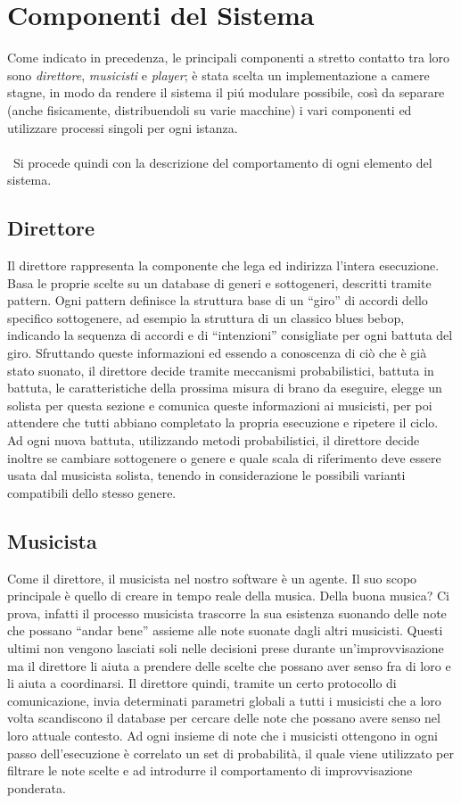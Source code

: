\section{Componenti del Sistema}
Come indicato in precedenza, le principali componenti a stretto contatto
tra loro sono \emph{direttore}, \emph{musicisti} e \emph{player}; \`e stata scelta un implementazione
a camere stagne, in modo da rendere il sistema il pi\'u modulare
possibile, così da separare (anche fisicamente, distribuendoli su varie macchine) i vari componenti ed utilizzare processi singoli per ogni istanza.\\\
\\\
Si procede quindi con la descrizione del comportamento di ogni
elemento del sistema.

\subsection{Direttore}
Il direttore rappresenta la componente che lega ed indirizza l'intera esecuzione. Basa le proprie scelte su un database di generi e sottogeneri, descritti tramite pattern.
Ogni pattern definisce la struttura base di un ``giro'' di accordi dello specifico sottogenere, ad esempio la struttura di un classico blues bebop, indicando la sequenza di accordi e di ``intenzioni'' consigliate per ogni battuta del giro. 
Sfruttando queste informazioni ed essendo a conoscenza di ciò che è già stato suonato, il direttore decide tramite meccanismi probabilistici, battuta in battuta, le caratteristiche della prossima misura di brano da eseguire, elegge un solista per questa sezione e comunica queste informazioni ai musicisti, per poi attendere che tutti abbiano completato la propria esecuzione e ripetere il ciclo.
Ad ogni nuova battuta, utilizzando metodi probabilistici, il direttore decide inoltre se cambiare sottogenere o genere e quale scala di riferimento deve essere usata dal musicista solista, tenendo in considerazione le possibili varianti compatibili dello stesso genere.

\subsection{Musicista}
Come il direttore, il musicista nel nostro software è un agente. 
Il suo scopo principale è quello di creare in tempo reale della musica.
Della buona musica? Ci prova, infatti il processo musicista trascorre la
sua esistenza suonando delle note che possano ``andar bene'' assieme alle note
 suonate dagli altri musicisti. Questi ultimi non vengono lasciati soli nelle 
decisioni prese durante un'improvvisazione ma il direttore li aiuta a prendere 
delle scelte che possano aver senso fra di loro e li aiuta a coordinarsi. 
Il direttore quindi, tramite un certo protocollo di comunicazione, 
invia determinati parametri globali a tutti i musicisti che a loro volta 
scandiscono il database per cercare delle note che possano avere senso nel loro 
attuale contesto. 
Ad ogni insieme di note che i musicisti ottengono in ogni passo dell'esecuzione
 è correlato un set di probabilità, il quale viene utilizzato per filtrare le 
note scelte e ad introdurre il comportamento di improvvisazione ponderata.

